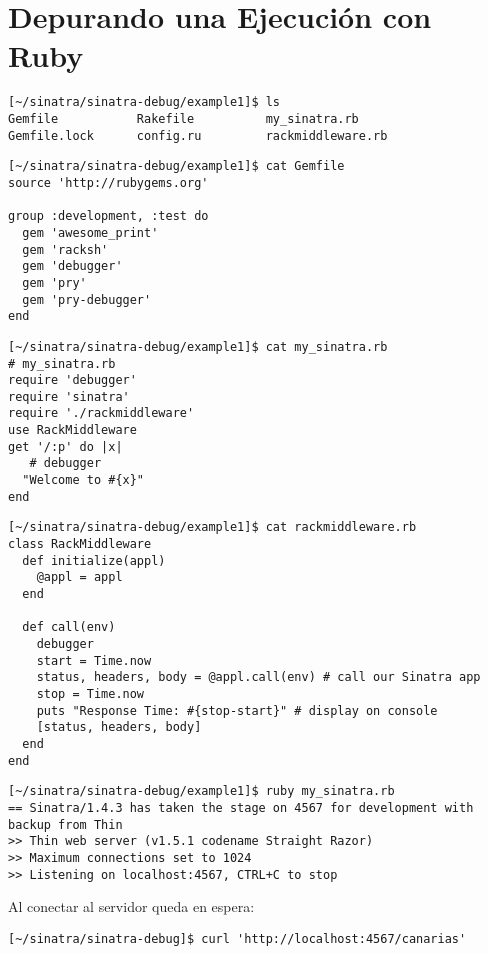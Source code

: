 
\section{Depurando una Ejecución con Ruby}
\label{section:depuracionsinatra}

\begin{verbatim}
[~/sinatra/sinatra-debug/example1]$ ls 
Gemfile           Rakefile          my_sinatra.rb
Gemfile.lock      config.ru         rackmiddleware.rb
\end{verbatim}

\begin{verbatim}
[~/sinatra/sinatra-debug/example1]$ cat Gemfile
source 'http://rubygems.org'

group :development, :test do
  gem 'awesome_print'
  gem 'racksh'
  gem 'debugger'
  gem 'pry'
  gem 'pry-debugger'
end
\end{verbatim}


\begin{verbatim}
[~/sinatra/sinatra-debug/example1]$ cat my_sinatra.rb 
# my_sinatra.rb
require 'debugger'
require 'sinatra'
require './rackmiddleware'
use RackMiddleware
get '/:p' do |x|
   # debugger
  "Welcome to #{x}"
end
\end{verbatim}


\begin{verbatim}
[~/sinatra/sinatra-debug/example1]$ cat rackmiddleware.rb 
class RackMiddleware
  def initialize(appl)
    @appl = appl
  end

  def call(env)
    debugger
    start = Time.now
    status, headers, body = @appl.call(env) # call our Sinatra app
    stop = Time.now
    puts "Response Time: #{stop-start}" # display on console
    [status, headers, body]
  end
end
\end{verbatim}

\begin{verbatim}
[~/sinatra/sinatra-debug/example1]$ ruby my_sinatra.rb 
== Sinatra/1.4.3 has taken the stage on 4567 for development with backup from Thin
>> Thin web server (v1.5.1 codename Straight Razor)
>> Maximum connections set to 1024
>> Listening on localhost:4567, CTRL+C to stop
\end{verbatim}

Al conectar al servidor queda en espera:
\begin{verbatim}
[~/sinatra/sinatra-debug]$ curl 'http://localhost:4567/canarias'
\end{verbatim}

